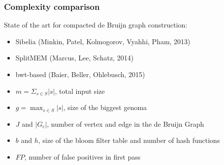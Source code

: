 \begin{frame}
	\frametitle{Complexity comparison}
	
	\centering
	
	
  State of the art for compacted de Bruijn graph construction:
  
	  \begin{itemize}
	    \item Sibelia (Minkin, Patel, Kolmogorov, Vyahhi, Pham, 2013)
	    \item SplitMEM (Marcus, Lee, Schatz, 2014)
	    \item bwt-based (Baier, Beller, Ohlebusch, 2015)
	  \end{itemize}

	  \pause	
	
	  \medskip
	  
        
    \medskip

	
    \begin{itemize}
      \item $m = \Sigma_{s \in S}{ |s| }$, total input size
      \item $g = \max_{s \in S}{ |s| }$, size of the biggest genoma
      \item $J$ and $|G_{c}|$, number of vertex and edge in the de Bruijn Graph
      \item $b$ and $h$, size of the bloom filter table and number of hash functions
      \item $FP$, number of false positives in first pass
    \end{itemize}
    

\end{frame}

